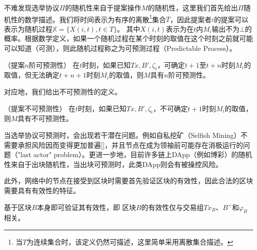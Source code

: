 不难发现选举协议$\Pi$的随机性来自于提案操作$M$的随机性，这里我们首先给出$\Pi$随机性的数学描述。我们将时间表示为有序的离散\footnote{当$T$为连续集合时，该定义仍然可描述，这里简单采用离散集合描述。}集合$T$，因此提案者$i$的提案可以表示为随机过程$\mathbb{X}=\{X(i,t),t\in T\}$。%
其中$X(i,t)$表示为在$t$内$M_i$输出不为$\bot$的概率。根据数学定义\cite{van2013introduction}，如果一个随机过程在某个时刻的取值在这个时刻之前就可能可以知道（可测），则此随机过程称之为可预测过程（Predictable Process）。

\begin{definition}
（提案$n$阶可预测性） 在$t$时刻，如果已知$Tx,B',\zeta_i$，可确定$t+1$至$t+n$时刻$M_i$的取值，但无法确定$t+n+1$时刻$M_i$的取值，则$M$具有$n$阶可预测性。
\end{definition}

对应地，我们给出不可预测性的定义。

\begin{definition}
（提案不可预测性） 在$t$时刻，如果已知$Tx,B',\zeta_i$，不可确定$t+1$时刻$M_i$的取值，则$M$具有不可预测性。
\end{definition}



当选举协议可预测时，会出现若干潜在问题。例如自私挖矿（Selfish Mining）\cite{eyal2018majority}不需要承担风险因而变得更加普遍[]，并且节点在成为领袖前可能存在消极运行的问题（"last actor" problem）\cite{hanke2018difinity}。更进一步地，目前许多链上DApp（例如博彩）的随机性来自于出块随机性，当出块可预测时，此类DApp则会有被操控风险。


此外，网络中的节点在接受到区块时需要首先验证区块的有效性，因此合法的区块需要具有有效性的特征。

\begin{property}
基于区块$B$本身即可验证其有效性，即                                                                                                                                                                                                                                                                                                                                                                                                                                                                                                                                                                                                                                                                                                                                                                   区块$B$的有效性仅与交易组$Tx_B$、$B^{\prec}$和$\varphi_B$相关。	
\end{property}

